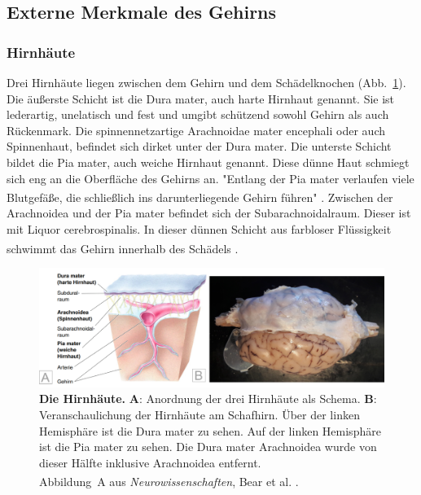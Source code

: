 \documentclass[12pt,a4paper,pdftex]{article}
\begin{document}
\subsection{Externe Merkmale des Gehirns}
\label{subsec:Externe_Merkmale}

\subsubsection{Hirnhäute} 

Drei Hirnhäute liegen zwischen dem Gehirn und dem Schädelknochen (Abb.~\ref{fig:hirnhaeute}). Die äußerste Schicht ist die Dura mater, auch harte Hirnhaut genannt. Sie ist lederartig, unelatisch und fest und umgibt schützend sowohl Gehirn als auch Rückenmark. Die spinnennetzartige Arachnoidae mater encephali oder auch Spinnenhaut, befindet sich dirket unter der Dura mater. Die unterste Schicht bildet die Pia mater, auch weiche Hirnhaut genannt. Diese dünne Haut schmiegt sich eng an die Oberfläche des Gehirns an. "Entlang der Pia mater verlaufen viele Blutgefäße, die schließlich ins darunterliegende Gehirn führen" \textsuperscript{\cite[7]{neurowissenschaften_baer}}. Zwischen der Arachnoidea und der Pia mater befindet sich der Subarachnoidalraum. Dieser ist mit Liquor cerebrospinalis. In dieser dünnen Schicht aus farbloser Flüssigkeit schwimmt das Gehirn innerhalb des Schädels \textsuperscript{\cite[7]{neurowissenschaften_baer}}.

\begin{figure}[H]
	\centering
	\includegraphics[width=\textwidth]{pictures/Bilder_Jule/Andere/hirnhaeute2.png}
	\caption[Die Hirnhäute]{\textbf{Die Hirnhäute.} \textbf{A}: Anordnung der drei Hirnhäute als Schema. \textbf{B}: Veranschaulichung der Hirnhäute am Schafhirn. Über der linken Hemisphäre ist die Dura mater zu sehen. Auf der linken Hemisphäre ist die Pia mater zu sehen. Die Dura mater Arachnoidea wurde von dieser Hälfte inklusive Arachnoidea entfernt.\\
	Abbildung~A aus \textit{Neurowissenschaften}, Bear et al. \textsuperscript{\cite[7]{neurowissenschaften_baer}}.}
	\label{fig:hirnhaeute}
\end{figure}
\end{document}
